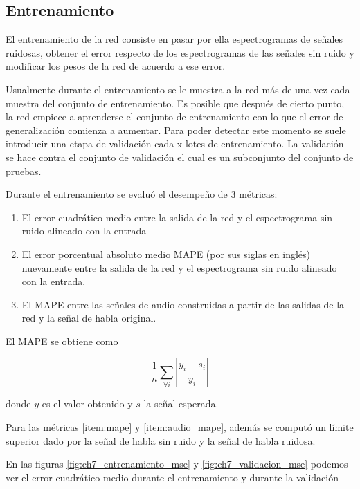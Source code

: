 \subsection{Entrenamiento}

El entrenamiento de la red consiste en pasar por ella espectrogramas de señales ruidosas, obtener el error respecto de los espectrogramas de las señales sin ruido y modificar los pesos de la red de acuerdo a ese error.

Usualmente durante el entrenamiento se le muestra a la red más de una vez cada muestra del conjunto de entrenamiento. Es posible que después de cierto punto, la red empiece a aprenderse el conjunto de entrenamiento con lo que el error de generalización comienza a aumentar. Para poder detectar este momento se suele introducir una etapa de validación cada x lotes de entrenamiento. La validación se hace contra el conjunto de validación el cual es un subconjunto del conjunto de pruebas.

Durante el entrenamiento se evaluó el desempeño de 3 métricas:

\begin{enumerate}
	\item El error cuadrático medio entre la salida de la red y el espectrograma sin ruido alineado con la entrada 
	\item El error porcentual absoluto medio MAPE (por sus siglas en inglés) nuevamente entre la salida de la red y el espectrograma sin ruido alineado con la entrada. \label{item:mape}
	\item El MAPE entre las señales de audio construidas a partir de las salidas de la red y la señal de habla original. \label{item:audio_mape}
\end{enumerate}

El MAPE se obtiene como

\begin{equation*}
	\frac{1}{n} \sum_{\forall i} \left| \frac{y_i - s_i}{y_i} \right|
\end{equation*}

donde $y$ es el valor obtenido y $s$ la señal esperada.

Para las métricas \ref{item:mape} y \ref{item:audio_mape}, además se computó un límite superior dado por la señal de habla sin ruido y la señal de habla ruidosa.

En las figuras \ref{fig:ch7_entrenamiento_mse} y \ref{fig:ch7_validacion_mse} podemos ver el error cuadrático medio durante el entrenamiento y durante la validación

